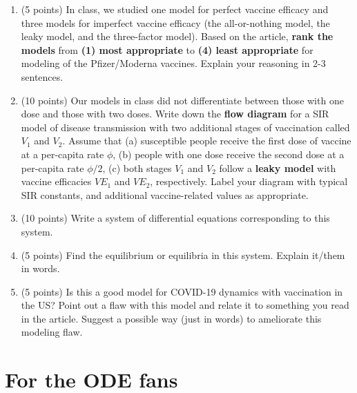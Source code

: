 \documentclass[11pt,onecolumn,superscriptaddress,notitlepage]{article}
\newcommand{\aaa}[0]{5 }
\newcommand{\bbb}[0]{10 }
\begin{document}
\begin{enumerate}[resume]
	\item (\aaa points) In class, we studied one model for perfect vaccine efficacy and three models for imperfect vaccine efficacy (the all-or-nothing model, the leaky model, and the three-factor model). Based on the article, {\bf rank the models} from {\bf (1) most appropriate} to {\bf (4) least appropriate} for modeling of the Pfizer/Moderna vaccines. Explain your reasoning in 2-3 sentences.
	\vspace{2in}
	
	\item (\bbb points) Our models in class did not differentiate between those with one dose and those with two doses. Write down the {\bf flow diagram} for a SIR model of disease transmission with two additional stages of vaccination called $V_1$ and $V_2$. Assume that (a) susceptible people receive the first dose of vaccine at a per-capita rate $\phi$, (b) people with one dose receive the second dose at a per-capita rate $\phi/2$, (c) both stages $V_1$ and $V_2$ follow a {\bf leaky model} with vaccine efficacies $VE_1$ and $VE_2$, respectively. Label your diagram with typical SIR constants, and additional vaccine-related values as appropriate.
	\vspace{2in}
	
	\item (\bbb points) Write a system of differential equations corresponding to this system.
	\vspace{2in}
	 
	\item (\aaa points) Find the equilibrium or equilibria in this system. Explain it/them in words. 
	\vspace{2in}
	
	\item (\aaa points) Is this a good model for COVID-19 dynamics with vaccination in the US? Point out a flaw with this model and relate it to something you read in the article. Suggest a possible way (just in words) to ameliorate this modeling flaw. 
\end{enumerate}




\clearpage
\section{For the ODE fans}
\end{document}
